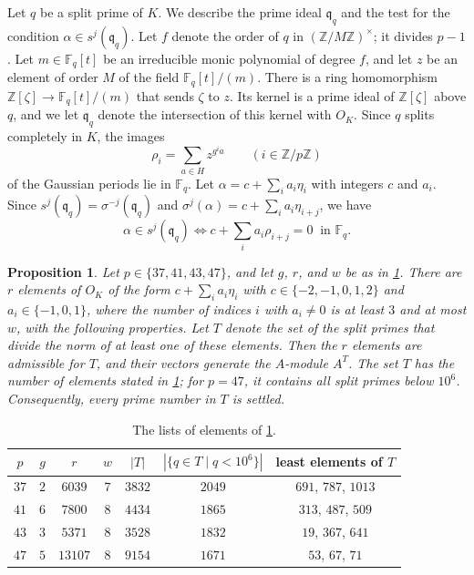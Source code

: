 \documentclass[11pt]{amsart}
\theoremstyle{plain}
\newtheorem{proposition}[theorem]{Proposition}
\theoremstyle{definition}
\begin{document}
Let $q$ be a split prime of $K$.
We describe the prime ideal $\mathfrak{q}_q$ and the test for the condition $\alpha \in s^j(\mathfrak{q}_q)$.
Let $f$ denote the order of $q$ in $(\mathbb{Z}/M\mathbb{Z})^\times$; it divides $p - 1$.
Let $m \in \mathbb{F}_q[t]$ be an irreducible monic polynomial of degree $f$, and let $z$ be an element of order $M$ of the field $\mathbb{F}_q[t]/(m)$.
There is a ring homomorphism $\mathbb{Z}[\zeta] \to \mathbb{F}_q[t]/(m)$ that sends $\zeta$ to $z$.
Its kernel is a prime ideal of $\mathbb{Z}[\zeta]$ above $q$, and we let $\mathfrak{q}_q$ denote the intersection of this kernel with $O_K$.
Since $q$ splits completely in $K$, the images
\[
\rho_i = \sum_{a \in H} z^{g^i a} \qquad (i \in \mathbb{Z}/p\mathbb{Z})
\]
of the Gaussian periods lie in $\mathbb{F}_q$.
Let $\alpha = c + \sum_i a_i \eta_i$ with integers $c$ and $a_i$.
Since $s^j(\mathfrak{q}_q) = \sigma^{-j}(\mathfrak{q}_q)$ and $\sigma^j(\alpha) = c + \sum_i a_i \eta_{i+j}$, we have
\begin{equation} \label{eq:test}
\alpha \in s^j(\mathfrak{q}_q) \iff c + \sum_i a_i \rho_{i+j} = 0 \ \text{ in } \mathbb{F}_q .
\end{equation}

\begin{proposition} \label{prop:datagrh}
Let $p \in \{37, 41, 43, 47\}$, and let $g$, $r$, and $w$ be as in \cref{tab:grh}.
There are $r$ elements of $O_K$ of the form $c + \sum_i a_i \eta_i$ with $c \in \{-2, -1, 0, 1, 2\}$ and $a_i \in \{-1, 0, 1\}$, where the number of indices $i$ with $a_i \ne 0$ is at least $3$ and at most $w$, with the following properties.
Let $T$ denote the set of the split primes that divide the norm of at least one of these elements.
Then the $r$ elements are admissible for $T$, and their vectors generate the $A$-module $A^T$.
The set $T$ has the number of elements stated in \cref{tab:grh}; for $p = 47$, it contains all split primes below $10^6$.
Consequently, every prime number in $T$ is settled.
\end{proposition}

\begin{table}[ht]
\centering
\begin{tabular}{ccccccc}
\toprule
$p$ & $g$ & $r$ & $w$ & $|T|$ & $|\{q \in T \mid q < 10^6\}|$ & least elements of $T$ \\
\midrule
$37$ & $2$ & $6039$ & $7$ & $3832$ & $2049$ & $691$, $787$, $1013$ \\
$41$ & $6$ & $7800$ & $8$ & $4434$ & $1865$ & $313$, $487$, $509$ \\
$43$ & $3$ & $5371$ & $8$ & $3528$ & $1832$ & $19$, $367$, $641$ \\
$47$ & $5$ & $13107$ & $8$ & $9154$ & $1671$ & $53$, $67$, $71$ \\
\bottomrule
\end{tabular}
\caption{The lists of elements of \cref{prop:datagrh}.}
\label{tab:grh}
\end{table}
\end{document}
